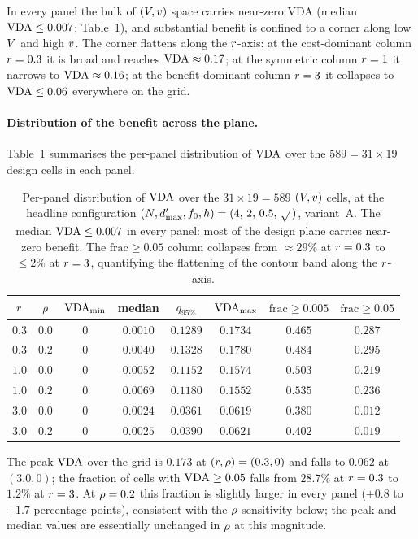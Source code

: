 %
In every panel the bulk of $(V, v)$ space carries near-zero
VDA (median $\mathrm{VDA} \le 0.007$; Table~\ref{tab:graded-marginals}), and
substantial benefit is confined to a corner along low $V$ and high
$v$. The corner flattens along the $r$-axis: at the
cost-dominant column $r = 0.3$ it is broad and reaches $\mathrm{VDA}
\approx 0.17$; at the symmetric column $r = 1$ it narrows to $\mathrm{VDA}
\approx 0.16$; at the benefit-dominant column $r = 3$ it collapses
to $\mathrm{VDA} \le 0.06$ everywhere on the grid.

\paragraph{Distribution of the benefit across the plane.}
Table~\ref{tab:graded-marginals} summarises the per-panel distribution
of $\mathrm{VDA}$ over the $589 = 31 \times 19$ design cells in each panel.
%
\begin{table}[t]
  \centering
  \small
  \begin{tabular}{c c c c c c c c}
    \toprule
    $r$ & $\rho$ &
    $\mathrm{VDA}_{\min}$ & median & $q_{95\%}$ & $\mathrm{VDA}_{\max}$ &
    $\mathrm{frac}\!\ge\!0.005$ & $\mathrm{frac}\!\ge\!0.05$ \\
    \midrule
    $0.3$ & $0.0$ & $0$ & $0.0010$ & $0.1289$ & $\mathbf{0.1734}$ & $0.465$ & $0.287$\\
    $0.3$ & $0.2$ & $0$ & $0.0040$ & $0.1328$ & $\mathbf{0.1780}$ & $0.484$ & $0.295$\\
    \midrule
    $1.0$ & $0.0$ & $0$ & $0.0052$ & $0.1152$ & $0.1574$ & $0.503$ & $0.219$\\
    $1.0$ & $0.2$ & $0$ & $0.0069$ & $0.1180$ & $0.1552$ & $0.535$ & $0.236$\\
    \midrule
    $3.0$ & $0.0$ & $0$ & $0.0024$ & $0.0361$ & $0.0619$ & $0.380$ & $0.012$\\
    $3.0$ & $0.2$ & $0$ & $0.0025$ & $0.0390$ & $0.0621$ & $0.402$ & $0.019$\\
    \bottomrule
  \end{tabular}
  \caption{Per-panel distribution of $\mathrm{VDA}$ over the $31 \times 19 =
  589$ $(V, v)$ cells, at the headline configuration $(N,
  d'_{\max}, f_0, h) = (4,\,2,\,0.5,\,\sqrt{}\,)$, variant~A. The
  median $\mathrm{VDA} \le 0.007$ in every panel: most of the design plane
  carries near-zero benefit. The $\mathrm{frac}\!\ge\!0.05$ column
  collapses from $\approx 29\%$ at $r = 0.3$ to $\le 2\%$ at
  $r = 3$, quantifying the flattening of the contour band along the
  $r$-axis.}
  \label{tab:graded-marginals}
\end{table}
%
The peak $\mathrm{VDA}$ over the grid is $0.173$ at $(r, \rho) = (0.3, 0)$
and falls to $0.062$ at $(3.0, 0)$; the fraction of cells with $\mathrm{VDA}
\ge 0.05$ falls from $28.7\%$ at $r = 0.3$ to $1.2\%$ at $r =
3$. At $\rho = 0.2$ this fraction is slightly larger in every panel
($+0.8$ to $+1.7$ percentage points), consistent with the
$\rho$-sensitivity below; the peak and median values are essentially
unchanged in $\rho$ at this magnitude.


